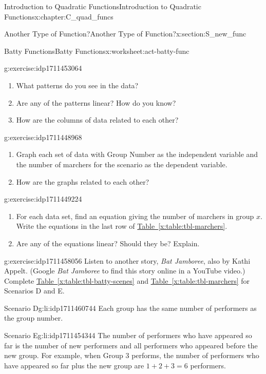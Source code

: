 \documentclass[oneside,10pt,]{book}
\newcommand{\xreffont}{\relax}
\newcommand{\pubtitle}[1]{\textsl{#1}}
\numberwithin{equation}{chapter}
\begin{document}
\begin{chapterptx}{Introduction to Quadratic Functions}{}{Introduction to Quadratic Functions}{}{}{x:chapter:C_quad_funcs}
\begin{sectionptx}{Another Type of Function?}{}{Another Type of Function?}{}{}{x:section:S_new_func}
\begin{worksheet-subsection}{Batty Functions}{}{Batty Functions}{}{}{x:worksheet:act-batty-func}
\begin{divisionexercise}{2}{}{}{g:exercise:idp1711453064}
\begin{enumerate}[font=\bfseries,label=(\alph*),ref=\alph*]
\item{}What patterns do you see in the data?%
\item{}Are any of the patterns linear? How do you know?%
\item{}How are the columns of data related to each other?%
\end{enumerate}
\end{divisionexercise}%
\begin{divisionexercise}{3}{}{}{g:exercise:idp1711448968}%
\begin{enumerate}[font=\bfseries,label=(\alph*),ref=\alph*]
\item\label{x:task:exer-marchers-graph}Graph each set of data with Group Number as the independent variable and the number of marchers for the scenario as the dependent variable.%
\item{}How are the graphs related to each other?%
\end{enumerate}
\end{divisionexercise}%
\begin{divisionexercise}{4}{}{}{g:exercise:idp1711449224}%
\begin{enumerate}[font=\bfseries,label=(\alph*),ref=\alph*]
\item{}For each data set, find an equation giving the number of marchers in group \(x\). Write the equations in the last row of \hyperref[x:table:tbl-marchers]{Table~{\xreffont\ref{x:table:tbl-marchers}}}.%
\item{}Are any of the equations linear? Should they be? Explain.%
\end{enumerate}
\end{divisionexercise}%
\clearpage
\begin{divisionexercise}{5}{}{}{g:exercise:idp1711458056}%
Listen to another story, \pubtitle{Bat Jamboree}, also by Kathi Appelt. (Google \pubtitle{Bat Jamboree} to find this story online in a YouTube video.) Complete \hyperref[x:table:tbl-batty-scenes]{Table~{\xreffont\ref{x:table:tbl-batty-scenes}}} and \hyperref[x:table:tbl-marchers]{Table~{\xreffont\ref{x:table:tbl-marchers}}} for Scenarios D and E.%
\begin{descriptionlist}
\begin{dlimedium}{Scenario D}{g:li:idp1711460744}%
Each group has the same number of performers as the group number.%
\end{dlimedium}%
\begin{dlimedium}{Scenario E}{g:li:idp1711454344}%
The number of performers who have appeared so far is the number of new performers and all performers who appeared before the new group. For example, when Group 3 performs, the number of performers who have appeared so far plus the new group are \(1 + 2 + 3 = 6\) performers.%

\end{dlimedium}
\end{descriptionlist}
\end{divisionexercise}
\end{worksheet-subsection}
\end{sectionptx}
\end{chapterptx}
\end{document}
